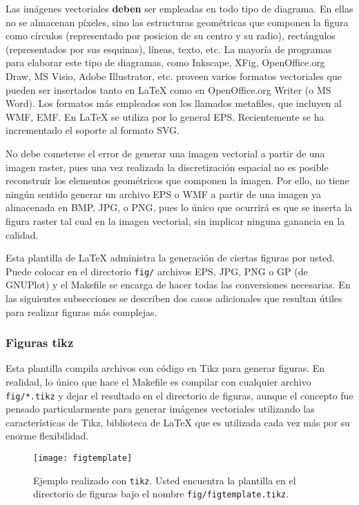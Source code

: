 Las imágenes vectoriales \textbf{deben} ser empleadas en todo tipo de
diagrama. En ellas no se almacenan píxeles, sino las estructuras geométricas
que componen la figura como círculos (representado por posicion de su centro y
su radio), rectángulos (representados por sus esquinas), líneas, texto, etc. La
mayoría de programas para elaborar este tipo de diagramas, como Inkscape, XFig,
OpenOffice.org Draw, MS Visio, Adobe Illustrator, etc. proveen varios formatos
vectoriales que pueden ser insertados tanto en LaTeX como en OpenOffice.org
Writer (o MS Word). Los formatos más empleados son los llamados metafiles, que
incluyen al WMF, EMF. En LaTeX se utiliza por lo general EPS. Recientemente se
ha incrementado el soporte al formato SVG.

No debe cometerse el error de generar una imagen vectorial a partir de una
imagen raster, pues una vez realizada la discretización espacial no es posible
reconstruir los elementos geométricos que componen la imagen. Por ello, no
tiene ningún sentido generar un archivo EPS o WMF a partir de una imagen ya
almacenada en BMP, JPG, o PNG, pues lo único que ocurrirá es que se inserta la
figura raster tal cual en la imagen vectorial, sin implicar ninguna ganancia en
la calidad.

Esta plantilla de LaTeX administra la generación de ciertas figuras por usted.
Puede colocar en el directorio \texttt{fig/} archivos EPS, JPG, PNG o GP (de
GNUPlot) y el Makefile se encarga de hacer todas las conversiones necesarias.
En las siguientes subsecciones se describen dos casos adicionales que resultan
útiles para realizar figuras más complejas.

\subsubsection{Figuras tikz}

Esta plantilla compila archivos con código en Tikz para generar
figuras.
%
En realidad, lo único que hace el Makefile es compilar con
 cualquier archivo \texttt{fig/*.tikz} y dejar el
resultado en el directorio de figuras, aunque el concepto fue pensado
particularmente para generar imágenes vectoriales utilizando las
características de Tikz, biblioteca de LaTeX que es utilizada cada vez
más por su enorme flexibilidad.
%
\begin{figure}[htb]
  \centering
  \texttt{[image: figtemplate]}
  \caption[Ejemplo de figura con tikz]{Ejemplo realizado con
    \texttt{tikz}.  Usted encuentra la plantilla en el directorio de
    figuras bajo el nombre \texttt{fig/figtemplate.tikz}.}
  \label{fig:figtemplate}
\end{figure}

